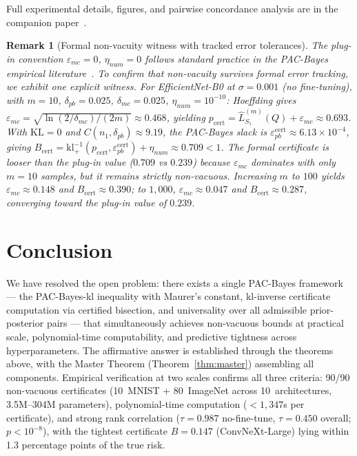 \documentclass[11pt,a4paper]{article}
\newtheorem{remark}[theorem]{Remark}
\newcommand{\kl}{\mathrm{kl}}
\newcommand{\KL}{\mathrm{KL}}
\newcommand{\klinv}{\kl^{-1}_+}
\begin{document}
Full experimental details, figures, and pairwise concordance analysis are in the companion paper~\cite{companion}.

\begin{remark}[Formal non-vacuity witness with tracked error tolerances]
\label{rem:formal-witness}
The plug-in convention $\varepsilon_{mc} = 0$, $\eta_{num} = 0$ follows standard practice in the PAC-Bayes empirical literature~\cite{dziugaite2017,zhou2019}. To confirm that non-vacuity survives formal error tracking, we exhibit one explicit witness. For EfficientNet-B0 at $\sigma = 0.001$ (no fine-tuning), with $m = 10$, $\delta_{pb} = 0.025$, $\delta_{mc} = 0.025$, $\eta_{num} = 10^{-10}$: Hoeffding gives $\varepsilon_{mc} = \sqrt{\ln(2/\delta_{mc})/(2m)} \approx 0.468$, yielding $p_{\mathrm{cert}} = \hat{L}_{S_1}^{(m)}(Q) + \varepsilon_{mc} \approx 0.693$. With $\KL = 0$ and $C(n_1, \delta_{pb}) \approx 9.19$, the PAC-Bayes slack is $\varepsilon_{pb}^{\mathrm{cert}} \approx 6.13 \times 10^{-4}$, giving $B_{\mathrm{cert}} = \klinv(p_{\mathrm{cert}}, \varepsilon_{pb}^{\mathrm{cert}}) + \eta_{num} \approx 0.709 < 1$. The formal certificate is looser than the plug-in value ($0.709$ vs $0.239$) because $\varepsilon_{mc}$ dominates with only $m = 10$ samples, but it remains strictly non-vacuous. Increasing $m$ to $100$ yields $\varepsilon_{mc} \approx 0.148$ and $B_{\mathrm{cert}} \approx 0.390$; to $1{,}000$, $\varepsilon_{mc} \approx 0.047$ and $B_{\mathrm{cert}} \approx 0.287$, converging toward the plug-in value of $0.239$.
\end{remark}

\section{Conclusion}

We have resolved the open problem: there exists a single PAC-Bayes framework --- the PAC-Bayes-kl inequality with Maurer's constant, kl-inverse certificate computation via certified bisection, and universality over all admissible prior-posterior pairs --- that simultaneously achieves non-vacuous bounds at practical scale, polynomial-time computability, and predictive tightness across hyperparameters. The affirmative answer is established through the theorems above, with the Master Theorem (Theorem~\ref{thm:master}) assembling all components. Empirical verification at two scales confirms all three criteria: 90/90 non-vacuous certificates (10~MNIST + 80~ImageNet across 10~architectures, 3.5M--304M parameters), polynomial-time computation ($< 1{,}347$s per certificate), and strong rank correlation ($\tau = 0.987$ no-fine-tune, $\tau = 0.450$ overall; $p < 10^{-8}$), with the tightest certificate $B = 0.147$ (ConvNeXt-Large) lying within 1.3 percentage points of the true risk.
\end{document}
